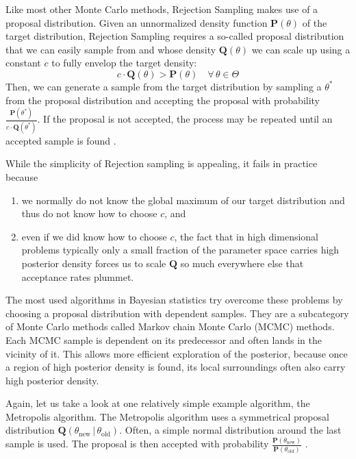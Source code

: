 \documentclass[12pt, a4paper]{report}
\begin{document}
Like most other Monte Carlo methods, Rejection Sampling makes use of a proposal distribution.
Given an unnormalized density function $\mathbf{P}(\theta)$ of the target distribution, Rejection Sampling requires a so-called proposal distribution that we can easily sample from and whose density $\mathbf{Q}(\theta)$ we can scale up using a constant $c$ to fully envelop the target density:
\begin{equation}
    c \cdot \mathbf{Q}(\theta) > \mathbf{P}(\theta) \quad \forall \, \theta \in \Theta \nonumber
\end{equation}
Then, we can generate a sample from the target distribution by sampling a $\theta^*$ from the proposal distribution and accepting the proposal with probability $\frac{\mathbf{P}(\theta^*)}{c \cdot \mathbf{Q}(\theta^*)}$.
If the proposal is not accepted, the process may be repeated until an accepted sample is found \cite[364]{mckay}.

While the simplicity of Rejection sampling is appealing, it fails in practice because
\begin{enumerate}
    \item we normally do not know the global maximum of our target distribution and thus do not know how to choose $c$, and
    \item even if we did know how to choose $c$, the fact that in high dimensional problems typically only a small fraction of the parameter space carries high posterior density forces us to scale $\mathbf{Q}$ so much everywhere else that acceptance rates plummet.
\end{enumerate}
 
The most used algorithms in Bayesian statistics try overcome these problems by choosing a proposal distribution with dependent samples.
They are a subcategory of Monte Carlo methods called Markov chain Monte Carlo (MCMC) methods.
Each MCMC sample is dependent on its predecessor and often lands in the vicinity of it.
This allows more efficient exploration of the posterior, because once a region of high posterior density is found, its local surroundings often also carry high posterior density. 

Again, let us take a look at one relatively simple example algorithm, the Metropolis algorithm.
The Metropolis algorithm uses a symmetrical proposal distribution $\mathbf{Q}(\theta_{\textrm{new}} \,|\, \theta_{\textrm{old}})$.
Often, a simple normal distribution around the last sample is used.
The proposal is then accepted with probability $\frac{\mathbf{P}(\theta_{\textrm{new}})}{\mathbf{P}(\theta_{\textrm{old}})}$ \cite[365f.]{mckay}.
\end{document}
